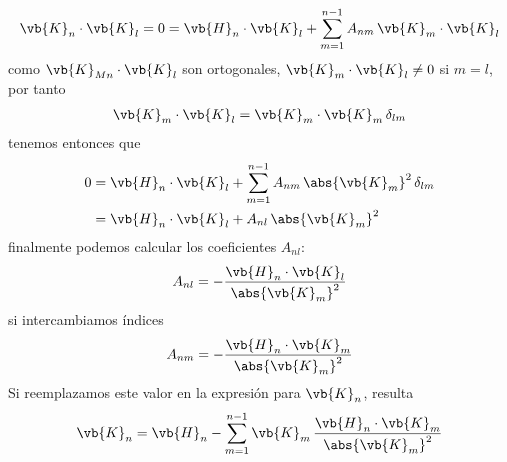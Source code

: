 \begin{align*}
\vb{K}_{n} \cdot \vb{K}_{l} = 0 = \vb{H}_{n} \cdot \vb{K}_{l} + \sum_{m=1}^{n-1} A_{nm} \, \vb{K}_{m} \cdot \vb{K}_{l}
\end{align*}
como $\vb{K}_{Mn} \cdot \vb{K}_{l}$ son ortogonales, $\vb{K}_{m} \cdot \vb{K}_{l} \neq 0$ si $m = l$, por tanto
\begin{align*}
\vb{K}_{m} \cdot \vb{K}_{l} = \vb{K}_{m} \cdot \vb{K}_{m} \, \delta_{lm}
\end{align*}
tenemos entonces que
\begin{align*}
0 &= \vb{H}_{n} \cdot \vb{K}_{l} + \sum_{m=1}^{n-1} A_{nm} \, \abs{\vb{K}_{m}}^{2} \,\delta_{lm} \\
&= \vb{H}_{n} \cdot \vb{K}_{l} + A_{nl} \, \abs{\vb{K}_{m}}^{2}
\end{align*}
finalmente podemos calcular los coeficientes $A_{nl}$:
\begin{align*}
A_{nl} = - \dfrac{\vb{H}_{n} \cdot \vb{K}_{l}}{\abs{\vb{K}_{m}}^{2}}
\end{align*}
si intercambiamos índices
\begin{align*}
A_{nm} = - \dfrac{\vb{H}_{n} \cdot \vb{K}_{m}}{\abs{\vb{K}_{m}}^{2}}
\end{align*}
Si reemplazamos este valor en la expresión para $\vb{K}_{n}$, resulta
\begin{align*}
\vb{K}_{n} = \vb{H}_{n} - \sum_{m=1}^{n-1} \vb{K}_{m} \, \dfrac{\vb{H}_{n} \cdot \vb{K}_{m}}{\abs{\vb{K}_{m}}^{2}}
\end{align*}
